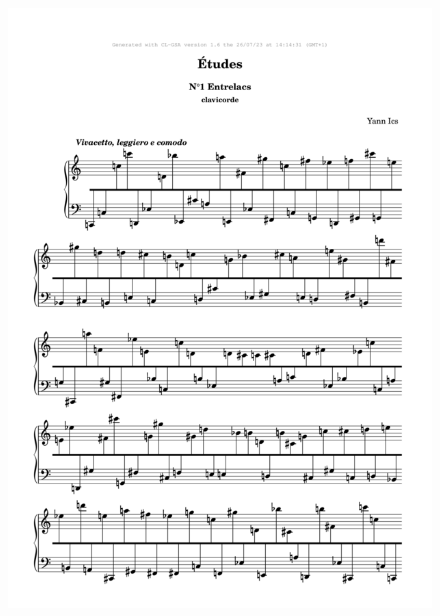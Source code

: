 \newpage

{}
\thispagestyle{empty}

\label{clav}

\vspace{3cm}

 \begin{figure}[H]
\begin{center}
\includegraphics[width=\textwidth]{mp/img/a-0.png}
\end{center}
\end{figure}

